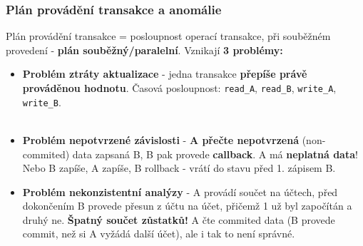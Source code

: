 \subsubsection{Plán provádění transakce a anomálie}
Plán provádění transakce = posloupnost operací transakce, při souběžném provedení - \textbf{plán souběžný/paralelní}. Vznikají \textbf{3 problémy:}
\begin{itemize}
\item \textbf{Problém ztráty aktualizace} - jedna transakce \textbf{přepíše právě prováděnou hodnotu}. Časová posloupnost: \texttt{read\_A}, \texttt{read\_B}, \texttt{write\_A}, \texttt{write\_B}.
\\\\
\noindent{}
\item \textbf{Problém nepotvrzené závislosti} - \textbf{A přečte nepotvrzená} (non-commited) data zapsaná B, B pak provede \textbf{callback}. A má \textbf{neplatná data}! Nebo B zapíše, A zapíše, B rollback - vrátí do stavu před 1. zápisem B.
\\
\noindent{}
\item \textbf{Problém nekonzistentní analýzy} - A provádí součet na účtech, před dokončením B provede přesun z účtu na účet, přičemž 1 už byl započítán a druhý ne. \textbf{Špatný součet zůstatků!} A čte commited data (B provede commit, než si A vyžádá další účet), ale i tak to není správné.
\\\\
\noindent{}
\end{itemize}

